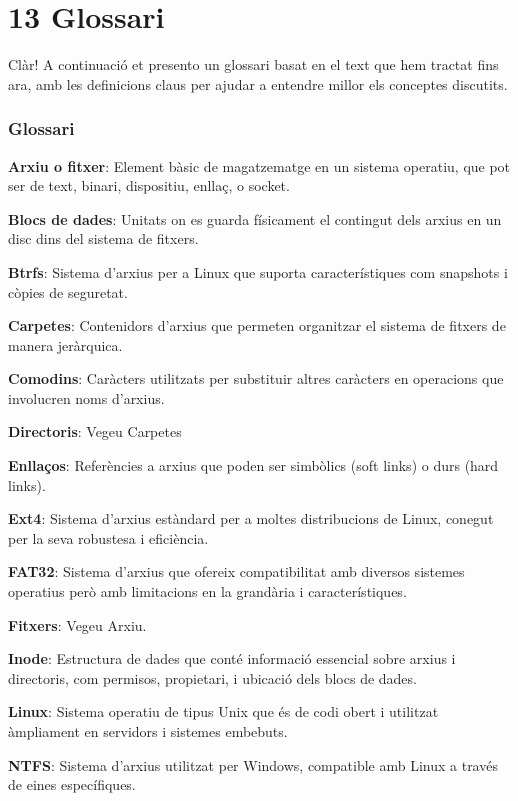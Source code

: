 \documentclass[
  12 pt,
  a4paper,
]{article}
\begin{document}
\section{13 Glossari}\label{glossari}

Clàr! A continuació et presento un glossari basat en el text que hem
tractat fins ara, amb les definicions claus per ajudar a entendre millor
els conceptes discutits.

\subsubsection{Glossari}\label{glossari-1}

\textbf{Arxiu o fitxer}: Element bàsic de magatzematge en un sistema
operatiu, que pot ser de text, binari, dispositiu, enllaç, o socket.

\textbf{Blocs de dades}: Unitats on es guarda físicament el contingut
dels arxius en un disc dins del sistema de fitxers.

\textbf{Btrfs}: Sistema d'arxius per a Linux que suporta
característiques com snapshots i còpies de seguretat.

\textbf{Carpetes}: Contenidors d'arxius que permeten organitzar el
sistema de fitxers de manera jeràrquica.

\textbf{Comodins}: Caràcters utilitzats per substituir altres caràcters
en operacions que involucren noms d'arxius.

\textbf{Directoris}: Vegeu Carpetes

\textbf{Enllaços}: Referències a arxius que poden ser simbòlics (soft
links) o durs (hard links).

\textbf{Ext4}: Sistema d'arxius estàndard per a moltes distribucions de
Linux, conegut per la seva robustesa i eficiència.

\textbf{FAT32}: Sistema d'arxius que ofereix compatibilitat amb diversos
sistemes operatius però amb limitacions en la grandària i
característiques.

\textbf{Fitxers}: Vegeu Arxiu.

\textbf{Inode}: Estructura de dades que conté informació essencial sobre
arxius i directoris, com permisos, propietari, i ubicació dels blocs de
dades.

\textbf{Linux}: Sistema operatiu de tipus Unix que és de codi obert i
utilitzat àmpliament en servidors i sistemes embebuts.

\textbf{NTFS}: Sistema d'arxius utilitzat per Windows, compatible amb
Linux a través de eines específiques.
\end{document}
